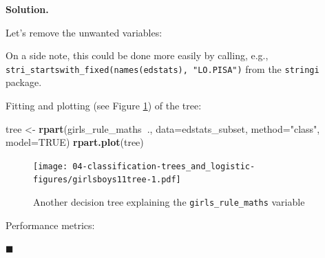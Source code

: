 \documentclass[10pt,b5paper,krantz1]{krantz}
\newenvironment{Shaded}{\begin{snugshade}}{\end{snugshade}}
\newcommand{\DataTypeTok}[1]{\textcolor[rgb]{0.27,0.27,0.27}{#1}}
\newcommand{\KeywordTok}[1]{\textcolor[rgb]{0.27,0.27,0.27}{\textbf{#1}}}
\newcommand{\NormalTok}[1]{#1}
\newcommand{\OperatorTok}[1]{\textcolor[rgb]{0.43,0.43,0.43}{\textbf{#1}}}
\newcommand{\OtherTok}[1]{\textcolor[rgb]{0.37,0.37,0.37}{#1}}
\newcommand{\StringTok}[1]{\textcolor[rgb]{0.5,0.5,0.5}{#1}}
\newenvironment{solution}{%
\bigskip\noindent\textbf{Solution. }%
\it\ignorespaces%
\ignorespaces%
}{\ignorespaces%
\hfill$\blacksquare$%
}
\begin{document}
\begin{solution}

Let's remove the unwanted variables:

\begin{Shaded}
\end{Shaded}

On a side note, this could be done more easily by calling, e.g.,
\texttt{stri\_startswith\_fixed(names(edstats),\ "LO.PISA")} from the \texttt{stringi} package.

Fitting and plotting (see Figure \ref{fig:girlsboys11tree}) of the tree:

\begin{Shaded}
\begin{Highlighting}[]
\NormalTok{tree <-}\StringTok{ }\KeywordTok{rpart}\NormalTok{(girls_rule_maths}\OperatorTok{~}\NormalTok{., }\DataTypeTok{data=}\NormalTok{edstats_subset,}
    \DataTypeTok{method=}\StringTok{"class"}\NormalTok{, }\DataTypeTok{model=}\OtherTok{TRUE}\NormalTok{)}
\KeywordTok{rpart.plot}\NormalTok{(tree)}
\end{Highlighting}
\end{Shaded}

\begin{figure}
\hypertarget{fig:girlsboys11tree}{%
\centering
\texttt{[image: 04-classification-trees\_and\_logistic-figures/girlsboys11tree-1.pdf]}
\caption{Another decision tree explaining the \texttt{girls\_rule\_maths} variable}\label{fig:girlsboys11tree}
}
\end{figure}

Performance metrics:

\begin{Shaded}
\end{Shaded}


\end{solution}
\end{document}
